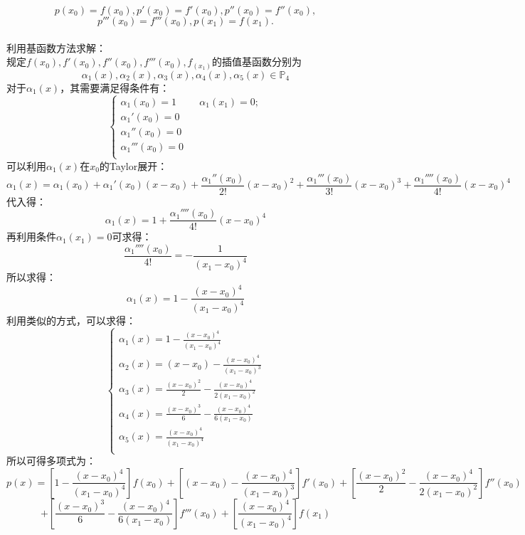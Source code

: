 \documentclass{article}
\begin{document}
\begin{itemize}
		$$p(x_{0})=f(x_{0}), p'(x_{0}) = f'(x_{0}), p''(x_{0}) = f''(x_{0}),$$
		$$p'''(x_{0}) = f'''(x_{0}), p(x_{1}) = f(x_{1}).$$\\
		利用基函数方法求解：
		\\规定$f(x_{0}),f'(x_{0}), f''(x_{0}), f'''(x_{0}), f_(x_{1})$的插值基函数分别为
		$$\alpha_{1}(x), \alpha_{2}(x), \alpha_{3}(x), \alpha_{4}(x), \alpha_{5}(x) \in \mathbb{P}_{4}$$
		对于$\alpha_{1}(x)$，其需要满足得条件有：
		$$\left\{
		\begin{array}{lcl}
			\alpha_{1}(x_{0}) = 1 && \alpha_{1}(x_{1}) = 0;\\
			\alpha_{1}'(x_{0}) = 0 \\
		    \alpha_{1}''(x_{0}) = 0\\
		    \alpha_{1}'''(x_{0}) = 0\\
		\end{array}
		\right.$$
		可以利用$\alpha_{1}(x)$在$x_{0}$的Taylor展开：
		$$\alpha_{1}(x) = \alpha_{1}(x_{0}) + \alpha_{1}'(x_{0})(x - x_{0}) + \frac{\alpha_{1}''(x_{0})}{2!}(x- x_{0})^{2} + \frac{\alpha_{1}'''(x_{0})}{3!}(x- x_{0})^{3} + \frac{\alpha_{1}''''(x_{0})}{4!}(x- x_{0})^{4}$$
		代入得：
		$$\alpha_{1}(x) = 1 + \frac{\alpha_{1}''''(x_{0})}{4!}(x- x_{0})^{4}$$
		再利用条件$\alpha_{1}(x_{1}) = 0$可求得：
		$$\frac{\alpha_{1}''''(x_{0})}{4!} = -\frac{1}{(x_{1}-x_{0})^{4}}$$
		所以求得：
		$$\alpha_{1}(x) = 1 -\frac{(x - x_{0})^{4}}{(x_{1} - x_{0})^{4}} $$
		利用类似的方式，可以求得：
		$$\left\{
		\begin{array}{lcl}
		\alpha_{1}(x) =  1 -\frac{(x - x_{0})^{4}}{(x_{1} - x_{0})^{4}}\\
		\alpha_{2}(x) = (x - x_{0})-\frac{(x - x_{0})^{4}}{(x_{1} - x_{0})^{3}}\\
		\alpha_{3}(x) = \frac{(x - x_{0})^2}{2} - \frac{(x - x_{0})^{4}}{2(x_{1} - x_{0})^{2}}\\
		\alpha_{4}(x) = \frac{(x - x_{0})^{3}}{6} - \frac{(x - x_{0})^{4}}{6(x_1 - x_{0})}\\
		\alpha_{5}(x) = \frac{(x - x_{0})^{4}}{(x_{1} - x_{0})^{4}}\\
		\end{array}\right.$$
		所以可得多项式为：
		$$p(x) = \left[ 1 -\frac{(x - x_{0})^{4}}{(x_{1} - x_{0})^{4}}\right]f(x_{0}) + \left[ (x - x_{0})-\frac{(x - x_{0})^{4}}{(x_{1} - x_{0})^{3}}\right]f'(x_{0}) + \left[\frac{(x - x_{0})^2}{2} - \frac{(x - x_{0})^{4}}{2(x_{1} - x_{0})^{2}}\right]f''(x_{0}) $$
		$$ + \left[\frac{(x - x_{0})^{3}}{6} - \frac{(x - x_{0})^{4}}{6(x_1 - x_{0})}\right]f'''(x_{0}) + \left[\frac{(x - x_{0})^{4}}{(x_{1} - x_{0})^{4}}\right]f(x_{1})$$

\end{itemize}
\end{document}
